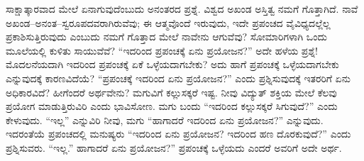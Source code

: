 ಸಾಕ್ಷಾತ್ಕಾರವಾದ ಮೇಲೆ ಏನಾಗುವುದೆಂಬುದು ಅನಂತರದ ಪ್ರಶ್ನೆ. ವಿಶ್ವದ ಅಖಂಡ ಅಸ್ತಿತ್ವ ನಮಗೆ ಗೊತ್ತಾಗಿದೆ. ನಾವೆ ಅಖಂಡ–ಅನಂತ–ಸ್ವರೂಪದವರಾಗಿರುವೆವು; ಈ ಆತ್ಮವೊಂದೆ ಇರುವುದು, ಇದೇ ಪ್ರಪಂಚದ ವೈವಿಧ್ಯದಲ್ಲೆಲ್ಲ ಪ್ರಕಾಶಿಸುತ್ತಿರುವುದು ಎಂಬುದು ನಮಗೆ ಗೊತ್ತಾದ ಮೇಲೆ ನಾವೇನು ಆಗುವೆವು? ಸೋಮಾರಿಗಳಾಗಿ ಒಂದು ಮೂಲೆಯಲ್ಲಿ ಕುಳಿತು ಸಾಯುವೆವೆ? “ಇದರಿಂದ ಪ್ರಪಂಚಕ್ಕೆ ಏನು ಪ್ರಯೋಜನ?” ಅದೇ ಹಳೆಯ ಪ್ರಶ್ನೆ! ಮೊದಲನೆಯದಾಗಿ ಇದರಿಂದ ಪ್ರಪಂಚಕ್ಕೆ ಏಕೆ ಒಳ್ಳೆಯದಾಗಬೇಕು? ಅದು ಹಾಗೆ ಪ್ರಪಂಚಕ್ಕೆ ಒಳ್ಳೆಯದಾಗಬೇಕು ಎನ್ನುವುದಕ್ಕೆ ಕಾರಣವಿದೆಯೆ? “ಪ್ರಪಂಚಕ್ಕೆ ಇದರಿಂದ ಏನು ಪ್ರಯೋಜನ?” ಎಂದು ಪ್ರಶ್ನಿಸುವುದಕ್ಕೆ ಇತರರಿಗೆ ಏನು ಅಧಿಕಾರವಿದೆ? ಹೀಗೆಂದರೆ ಅರ್ಥವೇನು? ಮಗುವಿಗೆ ಕಲ್ಲುಸಕ್ಕರೆ ಇಷ್ಟ. ನೀವು ವಿದ್ಯುತ್​ ಶಕ್ತಿಯ ಮೇಲೆ ಕೆಲವು ಪ್ರಯೋಗ ಮಾಡುತ್ತಿರುವಿರಿ ಎಂದು ಭಾವಿಸೋಣ. ಮಗು ಬಂದು “ಇದರಿಂದ ಕಲ್ಲುಸಕ್ಕರೆ ಸಿಗುವುದೆ?” ಎಂದು ಕೇಳುವುದು. “ಇಲ್ಲ” ಎನ್ನುವಿರಿ ನೀವು, ಮಗು “ಹಾಗಾದರೆ ಇದರಿಂದ ಏನು ಪ್ರಯೋಜನ?” ಎನ್ನುವುದು. ಇದರಂತೆಯೆ ಪ್ರಪಂಚದಲ್ಲಿ ಮನುಷ್ಯರು “ಇದರಿಂದ ಏನು ಪ್ರಯೋಜನ? ಇದರಿಂದ ಹಣ ದೊರಕುವುದೆ?” ಎಂದು ಪ್ರಶ್ನಿಸುವರು. “ಇಲ್ಲ.” ಹಾಗಾದರೆ ಏನು ಪ್ರಯೋಜನ?” ಪ್ರಪಂಚಕ್ಕೆ ಒಳ್ಳೆಯದು ಎಂದರೆ ಅವರಿಗೆ ಅದೇ ಅರ್ಥ.

\vskip 0.2cm

